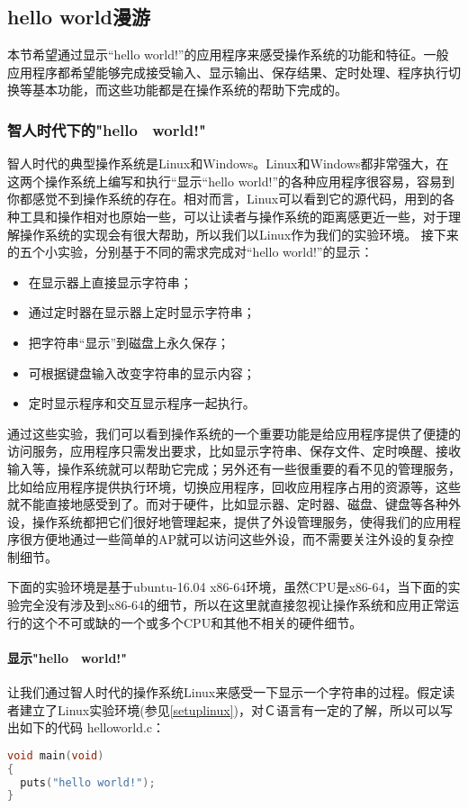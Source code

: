 \subsection{hello world漫游}

本节希望通过显示“hello world!”的应用程序来感受操作系统的功能和特征。一般应用程序都希望能够完成接受输入、显示输出、保存结果、定时处理、程序执行切换等基本功能，而这些功能都是在操作系统的帮助下完成的。

\subsubsection{智人时代下的"hello　world!"}

智人时代的典型操作系统是Linux和Windows。Linux和Windows都非常强大，在这两个操作系统上编写和执行“显示“hello world!”的各种应用程序很容易，容易到你都感觉不到操作系统的存在。相对而言，Linux可以看到它的源代码，用到的各种工具和操作相对也原始一些，可以让读者与操作系统的距离感更近一些，对于理解操作系统的实现会有很大帮助，所以我们以Linux作为我们的实验环境。
接下来的五个小实验，分别基于不同的需求完成对“hello world!”的显示：
\begin{itemize}
	\item 在显示器上直接显示字符串；
	\item 通过定时器在显示器上定时显示字符串；
	\item 把字符串“显示”到磁盘上永久保存；
	\item 可根据键盘输入改变字符串的显示内容；
	\item 定时显示程序和交互显示程序一起执行。
\end{itemize}

通过这些实验，我们可以看到操作系统的一个重要功能是给应用程序提供了便捷的访问服务，应用程序只需发出要求，比如显示字符串、保存文件、定时唤醒、接收输入等，操作系统就可以帮助它完成；另外还有一些很重要的看不见的管理服务，比如给应用程序提供执行环境，切换应用程序，回收应用程序占用的资源等，这些就不能直接地感受到了。而对于硬件，比如显示器、定时器、磁盘、键盘等各种外设，操作系统都把它们很好地管理起来，提供了外设管理服务，使得我们的应用程序很方便地通过一些简单的AP就可以访问这些外设，而不需要关注外设的复杂控制细节。


\begin{note} 
下面的实验环境是基于ubuntu-16.04 x86-64环境，虽然CPU是x86-64，当下面的实验完全没有涉及到x86-64的细节，所以在这里就直接忽视让操作系统和应用正常运行的这个不可或缺的一个或多个CPU和其他不相关的硬件细节。
\end{note}

\paragraph{显示"hello　world!"}
让我们通过智人时代的操作系统Linux来感受一下显示一个字符串的过程。假定读者建立了Linux实验环境(参见\ref{setuplinux})，对Ｃ语言有一定的了解，所以可以写出如下的代码 helloworld.c：
\begin{lstlisting}[language={C}]
void main(void)
{
  puts("hello world!");
}
\end{lstlisting}

